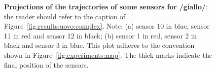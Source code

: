 \begin{figure}
  \centering
	\hspace{0.05\textwidth}

	\caption[Projections of the trajectories of some sensors for /giallo/]{\textbf{Projections of the trajectories of some sensors for /giallo/}: 
	the reader should refer to the caption of
	Figure~\ref{fig:results:uovo:complex}.
	Note: (a) sensor 10 in blue, sensor 11 in red and sensor 12 in black; 
	(b) sensor 1 in red, sensor 2 in black and sensor 3 in blue.
	This plot adheres to the convention shown in 
	Figure~\ref{fig:experiments:map}.
	The thick marks indicate the final position of the sensors.
	}
	\label{fig:results:giallo:complex}
\end{figure}
